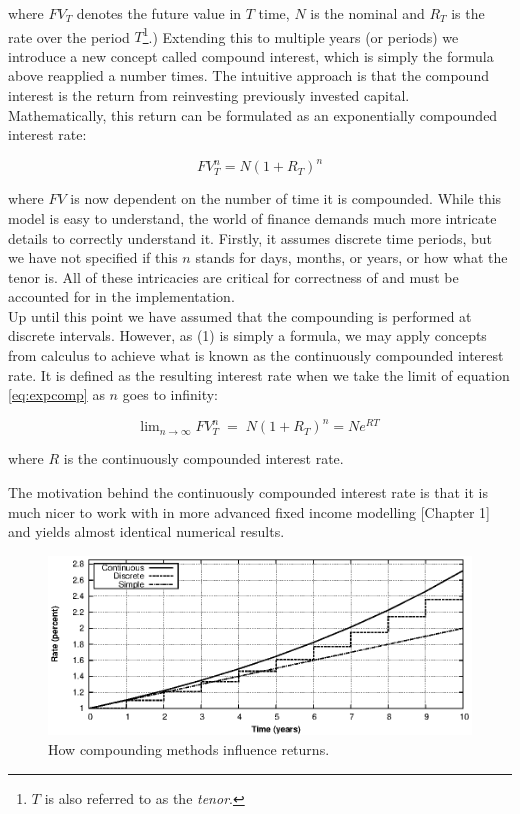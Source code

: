 where $FV_T$ denotes the future value in $T$ time, $N$ is the nominal and $R_T$
is the rate over the period $T$\footnote{$T$ is also referred to as the
\emph{tenor}.}.) Extending this to multiple years (or periods) we introduce a new 
concept called compound interest, which is  simply the formula above reapplied
a number times. The intuitive approach is
that the compound interest is the return from reinvesting previously invested
capital. Mathematically, this return can be formulated as an exponentially 
compounded interest rate:

\begin{equation}\label{eq:expcomp}
FV_T^n = N (1 + R_T)^n
\end{equation}

where $FV$ is now dependent on the number of time it is compounded.
While this model is easy to understand, the world of finance demands much more 
intricate details to correctly understand it. Firstly, it assumes 
discrete time periods, but we have not specified if this $n$ stands for days, 
months, or years, or how what the tenor is. All of these intricacies are critical
for correctness of \hql and must be accounted for in the implementation.\\

Up until this point we have assumed that the compounding is performed at 
discrete intervals. However, as (1) is simply a formula, we may apply concepts 
from calculus to achieve what is known as the continuously compounded interest 
rate. It is defined as the resulting interest rate when we take the limit of 
equation \ref{eq:expcomp} as $n$ goes to infinity:

\begin{equation}\label{eq:expcomp}
\text{lim}_{n \rightarrow \infty}\; FV_T^n \; = \; N (1 + R_T)^n
= N e^{RT}
\end{equation}

where $R$ is the continuously compounded interest rate.

The motivation behind the continuously compounded interest rate is that it is
much nicer to work with in more advanced fixed income modelling
\cite{cmunk}[Chapter 1] and yields almost identical numerical results.\\

\begin{figure}[!htb]
\centering
\includegraphics[scale=1.2]{images/comp02.eps}
\caption{How compounding methods influence returns.}
\label{fig:comp02}
\end{figure}

